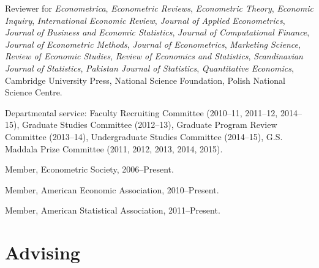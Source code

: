 \documentclass[10pt,letterpaper]{article}
\renewenvironment{itemize}{
  \begin{list}{}{
    \setlength{\leftmargin}{1.5em}
    \setlength{\itemsep}{0.25em}
    \setlength{\parskip}{0pt}
    \setlength{\parsep}{0.25em}
  }
}{
  \end{list}
}
\begin{document}
\begin{itemize}
\item Reviewer for
  \textit{Econometrica}, %
  \textit{Econometric Reviews}, %
  \textit{Econometric Theory}, %
  \textit{Economic Inquiry}, %
  \textit{International Economic Review}, %
  \textit{Journal of Applied Econometrics}, %
  \textit{Journal of Business and Economic Statistics}, %
  \textit{Journal of Computational Finance}, %
  \textit{Journal of Econometric Methods}, %
  \textit{Journal of Econometrics}, %
  \textit{Marketing Science}, %
  \textit{Review of Economic Studies}, %
  \textit{Review of Economics and Statistics}, %
  \textit{Scandinavian Journal of Statistics}, %
  \textit{Pakistan Journal of Statistics}, %
  \textit{Quantitative Economics}, %
  Cambridge University Press, %
  National Science Foundation, %
  Polish National Science Centre. %
\item Departmental service:
  Faculty Recruiting Committee (2010--11, 2011--12, 2014--15),
  Graduate Studies Committee (2012--13),
  Graduate Program Review Committee (2013--14),
  Undergraduate Studies Committee (2014--15),
  G.S. Maddala Prize Committee (2011, 2012, 2013, 2014, 2015).
\item Member, Econometric Society, 2006--Present.
\item Member, American Economic Association, 2010--Present.
\item Member, American Statistical Association, 2011--Present.
\end{itemize}

\section*{Advising}
\end{document}
